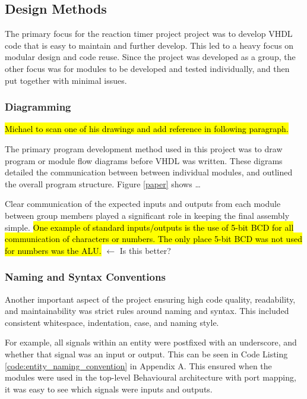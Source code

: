 \documentclass[11pt]{article}
\begin{document}
\subsection{Design Methods}

The primary focus for the reaction timer project project was to develop VHDL code that is easy to maintain and further develop. This led to a heavy focus on modular design and code reuse. Since the project was developed as a group, the other focus was for modules to be developed and tested individually, and then put together with minimal issues.

\subsubsection{Diagramming}

\hl{Michael to scan one of his drawings and add reference in following paragraph.}

The primary program development method used in this project was to draw program or module flow diagrams before VHDL was written. These digrams detailed the communication between between individual modules, and outlined the overall program structure. Figure \ref{paper} shows \dots

Clear communication of the expected inputs and outputs from each module between group members played a significant role in keeping the final assembly simple. \hl{One example of standard inputs/outputs is the use of 5-bit BCD for all communication of characters or numbers. The only place 5-bit BCD was not used for numbers was the ALU.} $\leftarrow$ Is this better?

\subsubsection{Naming and Syntax Conventions}

Another important aspect of the project ensuring high code quality, readability, and maintainability was strict rules around naming and syntax. This included consistent whitespace, indentation, case, and naming style. 

For example, all signals within an entity were postfixed with an underscore, and whether that signal was an input or output. This can be seen in Code Listing \ref{code:entity_naming_convention} in Appendix A. This ensured when the modules were used in the top-level Behavioural architecture with port mapping, it was easy to see which signals were inputs and outputs.
\end{document}
